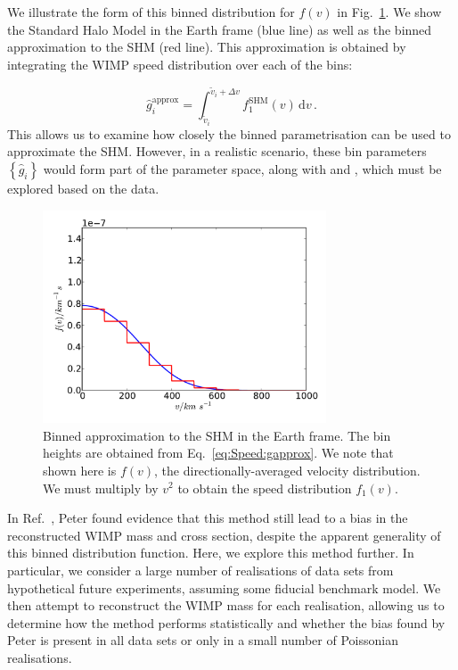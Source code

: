 We illustrate the form of this binned distribution for $f(v)$ in Fig.~\ref{fig:Speed:BinApprox}. We show the Standard Halo Model in the Earth frame (blue line) as well as the binned approximation to the SHM (red line). This approximation is obtained by integrating the WIMP speed distribution over each of the bins:

\begin{equation}
\label{eq:Speed:gapprox}
\hat{g}_i^\textrm{approx} = \int_{\tilde{v}_i}^{\tilde{v}_i + \Delta v} f_1^{\textrm{SHM}}(v) \, \mathrm{d}v\,.
\end{equation}
This allows us to examine how closely the binned parametrisation can be used to approximate the SHM. However, in a realistic scenario, these bin parameters $\left\{\hat{g}_i\right\}$ would form part of the parameter space, along with \mchi and \sigmapsi, which must be explored based on the data. 

\begin{figure}[h]
\centering
  \includegraphics[width=0.75\textwidth]{Speed/BinnedApprox.pdf}
  \caption[Binned approximation to the SHM]{Binned approximation to the SHM in the Earth frame. The bin heights are obtained from Eq.~\ref{eq:Speed:gapprox}. We note that shown here is $f(v)$, the directionally-averaged velocity distribution. We must multiply by $v^2$ to obtain the speed distribution $f_1(v)$.}
  \label{fig:Speed:BinApprox}
\end{figure}

In Ref.~\cite{Peter:2011}, Peter found evidence that this method still lead to a bias in the reconstructed WIMP mass and cross section, despite the apparent generality of this binned distribution function. Here, we explore this method further. In particular, we consider a large number of realisations of data sets from hypothetical future experiments, assuming some fiducial benchmark model. We then attempt to reconstruct the WIMP mass for each realisation, allowing us to determine how the method performs statistically and whether the bias found by Peter is present in all data sets or only in a small number of Poissonian realisations.

